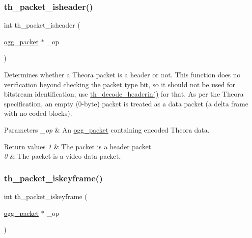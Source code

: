 \subsubsection{\texorpdfstring{th\+\_\+packet\+\_\+isheader()}{th\_packet\_isheader()}}
{\footnotesize\ttfamily int th\+\_\+packet\+\_\+isheader (\begin{DoxyParamCaption}\item[{\hyperlink{structogg__packet}{ogg\+\_\+packet} $\ast$}]{\+\_\+op }\end{DoxyParamCaption})}

Determines whether a Theora packet is a header or not. This function does no verification beyond checking the packet type bit, so it should not be used for bitstream identification; use \hyperlink{group__decfuncs_ga006d01d36fbe64768c571e6a12b7fc50}{th\+\_\+decode\+\_\+headerin()} for that. As per the Theora specification, an empty (0-\/byte) packet is treated as a data packet (a delta frame with no coded blocks). 
\begin{DoxyParams}{Parameters}
{\em \+\_\+op} & An {\ttfamily \hyperlink{structogg__packet}{ogg\+\_\+packet}} containing encoded Theora data. \\
\hline
\end{DoxyParams}

\begin{DoxyRetVals}{Return values}
{\em 1} & The packet is a header packet \\
\hline
{\em 0} & The packet is a video data packet. \\
\hline
\end{DoxyRetVals}
\mbox{\label{group__basefuncs_gafe95cfd06f0fef413266c9168a66248a}} 
\subsubsection{\texorpdfstring{th\+\_\+packet\+\_\+iskeyframe()}{th\_packet\_iskeyframe()}}
{\footnotesize\ttfamily int th\+\_\+packet\+\_\+iskeyframe (\begin{DoxyParamCaption}\item[{\hyperlink{structogg__packet}{ogg\+\_\+packet} $\ast$}]{\+\_\+op }\end{DoxyParamCaption})}

